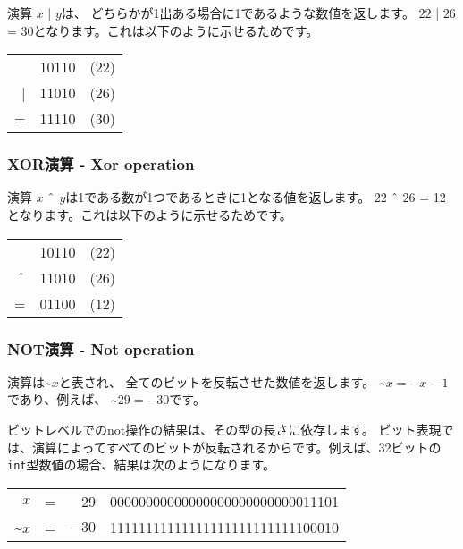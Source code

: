 
演算 $x$ | $y$は、
どちらかが1出ある場合に1であるような数値を返します。
$22$ | $26$ = 30となります。これは以下のように示せるためです。

\begin{center}
\begin{tabular}{rrr}
& 10110 & (22)\\
| & 11010 & (26) \\
\hline
 = & 11110 & (30) \\
\end{tabular}
\end{center}

\subsubsection{XOR演算 - Xor operation}


演算 $x$ $\XOR$ $y$は1である数が1つであるときに1となる値を返します。
$22$ $\XOR$ $26$ = 12となります。これは以下のように示せるためです。

\begin{center}
\begin{tabular}{rrr}
& 10110 & (22)\\
$\XOR$ & 11010 & (26) \\
\hline
 = & 01100 & (12) \\
\end{tabular}
\end{center}

\subsubsection{NOT演算 - Not operation}


 演算は\textasciitilde$x$と表され、
全てのビットを反転させた数値を返します。
\textasciitilde$x = -x-1$であり、例えば、
\textasciitilde$29 = -30$です。

ビットレベルでのnot操作の結果は、その型の長さに依存します。
ビット表現では、演算によってすべてのビットが反転されるからです。例えば、32ビットの\texttt{int}型数値の場合、結果は次のようになります。
\begin{center}
\begin{tabular}{rrrr}
$x$ & = & 29 &   00000000000000000000000000011101 \\
\textasciitilde$x$ & = & $-30$ & 11111111111111111111111111100010 \\
\end{tabular}
\end{center}

